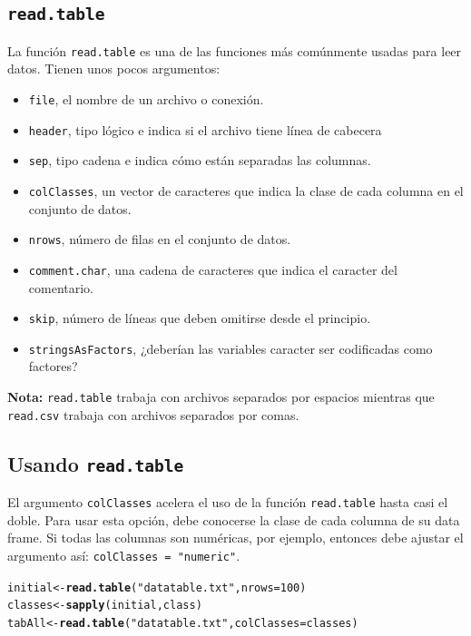 \documentclass{article}\usepackage[]{graphicx}\usepackage[]{color}
\makeatletter
\newcommand{\hlnum}[1]{\textcolor[rgb]{0.686,0.059,0.569}{#1}}%
\newcommand{\hlstr}[1]{\textcolor[rgb]{0.192,0.494,0.8}{#1}}%
\newcommand{\hlstd}[1]{\textcolor[rgb]{0.345,0.345,0.345}{#1}}%
\newcommand{\hlkwb}[1]{\textcolor[rgb]{0.69,0.353,0.396}{#1}}%
\newcommand{\hlkwc}[1]{\textcolor[rgb]{0.333,0.667,0.333}{#1}}%
\newcommand{\hlkwd}[1]{\textcolor[rgb]{0.737,0.353,0.396}{\textbf{#1}}}%
\newenvironment{kframe}{%
 \def\at@end@of@kframe{}%
 \ifinner\ifhmode%
  \def\at@end@of@kframe{\end{minipage}}%
  \begin{minipage}{\columnwidth}%
 \fi\fi%
 \def\FrameCommand##1{\hskip\@totalleftmargin \hskip-\fboxsep
 \colorbox{shadecolor}{##1}\hskip-\fboxsep
     \hskip-\linewidth \hskip-\@totalleftmargin \hskip\columnwidth}%
 \MakeFramed {\advance\hsize-\width
   \@totalleftmargin\z@ \linewidth\hsize
   \@setminipage}}%
 {\par\unskip\endMakeFramed%
 \at@end@of@kframe}
\newenvironment{knitrout}{}{} %
\makeatother
\begin{document}
  \subsection{\texttt{read.table}}
  La función \texttt{read.table} es una de las funciones más comúnmente usadas para leer datos. Tienen unos pocos argumentos:
  \begin{itemize}
    \item \texttt{file}, el nombre de un archivo o conexión.
    \item \texttt{header}, tipo lógico e indica si el archivo tiene línea de cabecera
    \item \texttt{sep}, tipo cadena e indica cómo están separadas las columnas.
    \item \texttt{colClasses}, un vector de caracteres que indica la clase de cada columna en el conjunto de datos.
    \item \texttt{nrows}, número de filas en el conjunto de datos.
    \item \texttt{comment.char}, una cadena de caracteres que indica el caracter del comentario.
    \item \texttt{skip}, número de líneas que deben omitirse desde el principio.
    \item \texttt{stringsAsFactors}, ¿deberían las variables caracter ser codificadas como factores?
\end{itemize}

\textbf{Nota:} \texttt{read.table} trabaja con archivos separados por espacios mientras que \texttt{read.csv} trabaja con archivos separados por comas.

  \subsection{Usando \texttt{read.table}}
  El argumento \texttt{colClasses} acelera el uso de la función \texttt{read.table} hasta casi el doble. Para usar esta opción, debe conocerse la clase de cada columna de su data frame. Si todas las columnas son numéricas, por ejemplo, entonces debe ajustar el argumento así: \texttt{colClasses = "numeric"}. 
\begin{knitrout}
\color{fgcolor}\begin{kframe}
\begin{alltt}
  \hlstd{initial} \hlkwb{<-} \hlkwd{read.table}\hlstd{(}\hlstr{"datatable.txt"}\hlstd{,} \hlkwc{nrows} \hlstd{=} \hlnum{100}\hlstd{)}
  \hlstd{classes} \hlkwb{<-} \hlkwd{sapply}\hlstd{(initial, class)}
  \hlstd{tabAll} \hlkwb{<-} \hlkwd{read.table} \hlstd{(}\hlstr{"datatable.txt"}\hlstd{,} \hlkwc{colClasses} \hlstd{= classes)}
\end{alltt}
\end{kframe}
\end{knitrout}
  
\end{document}
